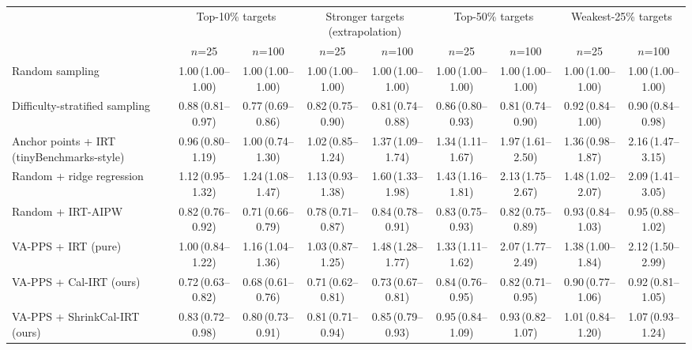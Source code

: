 \begin{tabular}{lcccccccc}
\toprule
 & \multicolumn{2}{c}{Top-10\% targets} & \multicolumn{2}{c}{Stronger targets (extrapolation)} & \multicolumn{2}{c}{Top-50\% targets} & \multicolumn{2}{c}{Weakest-25\% targets} \\
 & $n$=25 & $n$=100 & $n$=25 & $n$=100 & $n$=25 & $n$=100 & $n$=25 & $n$=100 \\
\midrule
Random sampling & 1.00\,\scriptsize(1.00--1.00) & 1.00\,\scriptsize(1.00--1.00) & 1.00\,\scriptsize(1.00--1.00) & 1.00\,\scriptsize(1.00--1.00) & 1.00\,\scriptsize(1.00--1.00) & 1.00\,\scriptsize(1.00--1.00) & 1.00\,\scriptsize(1.00--1.00) & 1.00\,\scriptsize(1.00--1.00) \\
Difficulty-stratified sampling & 0.88\,\scriptsize(0.81--0.97) & 0.77\,\scriptsize(0.69--0.86) & 0.82\,\scriptsize(0.75--0.90) & 0.81\,\scriptsize(0.74--0.88) & 0.86\,\scriptsize(0.80--0.93) & 0.81\,\scriptsize(0.74--0.90) & 0.92\,\scriptsize(0.84--1.00) & 0.90\,\scriptsize(0.84--0.98) \\
Anchor points + IRT (tinyBenchmarks-style) & 0.96\,\scriptsize(0.80--1.19) & 1.00\,\scriptsize(0.74--1.30) & 1.02\,\scriptsize(0.85--1.24) & 1.37\,\scriptsize(1.09--1.74) & 1.34\,\scriptsize(1.11--1.67) & 1.97\,\scriptsize(1.61--2.50) & 1.36\,\scriptsize(0.98--1.87) & 2.16\,\scriptsize(1.47--3.15) \\
Random + ridge regression & 1.12\,\scriptsize(0.95--1.32) & 1.24\,\scriptsize(1.08--1.47) & 1.13\,\scriptsize(0.93--1.38) & 1.60\,\scriptsize(1.33--1.98) & 1.43\,\scriptsize(1.16--1.81) & 2.13\,\scriptsize(1.75--2.67) & 1.48\,\scriptsize(1.02--2.07) & 2.09\,\scriptsize(1.41--3.05) \\
Random + IRT-AIPW & 0.82\,\scriptsize(0.76--0.92) & 0.71\,\scriptsize(0.66--0.79) & 0.78\,\scriptsize(0.71--0.87) & 0.84\,\scriptsize(0.78--0.91) & 0.83\,\scriptsize(0.75--0.93) & 0.82\,\scriptsize(0.75--0.89) & 0.93\,\scriptsize(0.84--1.03) & 0.95\,\scriptsize(0.88--1.02) \\
VA-PPS + IRT (pure) & 1.00\,\scriptsize(0.84--1.22) & 1.16\,\scriptsize(1.04--1.36) & 1.03\,\scriptsize(0.87--1.25) & 1.48\,\scriptsize(1.28--1.77) & 1.33\,\scriptsize(1.11--1.62) & 2.07\,\scriptsize(1.77--2.49) & 1.38\,\scriptsize(1.00--1.84) & 2.12\,\scriptsize(1.50--2.99) \\
VA-PPS + Cal-IRT (ours) & 0.72\,\scriptsize(0.63--0.82) & 0.68\,\scriptsize(0.61--0.76) & 0.71\,\scriptsize(0.62--0.81) & 0.73\,\scriptsize(0.67--0.81) & 0.84\,\scriptsize(0.76--0.95) & 0.82\,\scriptsize(0.71--0.95) & 0.90\,\scriptsize(0.77--1.06) & 0.92\,\scriptsize(0.81--1.05) \\
VA-PPS + ShrinkCal-IRT (ours) & 0.83\,\scriptsize(0.72--0.98) & 0.80\,\scriptsize(0.73--0.91) & 0.81\,\scriptsize(0.71--0.94) & 0.85\,\scriptsize(0.79--0.93) & 0.95\,\scriptsize(0.84--1.09) & 0.93\,\scriptsize(0.82--1.07) & 1.01\,\scriptsize(0.84--1.20) & 1.07\,\scriptsize(0.93--1.24) \\
\bottomrule
\end{tabular}
